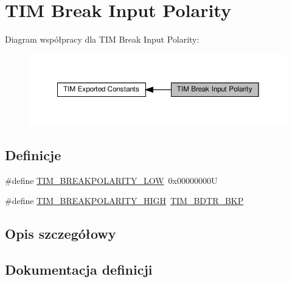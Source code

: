 \hypertarget{group___t_i_m___break___polarity}{}\section{T\+IM Break Input Polarity}
\label{group___t_i_m___break___polarity}
Diagram współpracy dla T\+IM Break Input Polarity\+:\nopagebreak
\begin{figure}[H]
\begin{center}
\leavevmode
\includegraphics[width=350pt]{group___t_i_m___break___polarity}
\end{center}
\end{figure}
\subsection*{Definicje}
\begin{DoxyCompactItemize}
\item 
\#define \hyperlink{group___t_i_m___break___polarity_ga3e07cb0376c1bf561341dc8befb66208}{T\+I\+M\+\_\+\+B\+R\+E\+A\+K\+P\+O\+L\+A\+R\+I\+T\+Y\+\_\+\+L\+OW}~0x00000000U
\item 
\#define \hyperlink{group___t_i_m___break___polarity_ga97c30f1134accd61e3e42ce37e472700}{T\+I\+M\+\_\+\+B\+R\+E\+A\+K\+P\+O\+L\+A\+R\+I\+T\+Y\+\_\+\+H\+I\+GH}~\hyperlink{group___peripheral___registers___bits___definition_ga3247abbbf0d00260be051d176d88020e}{T\+I\+M\+\_\+\+B\+D\+T\+R\+\_\+\+B\+KP}
\end{DoxyCompactItemize}


\subsection{Opis szczegółowy}


\subsection{Dokumentacja definicji}
\mbox{\label{group___t_i_m___break___polarity_ga97c30f1134accd61e3e42ce37e472700}} 
